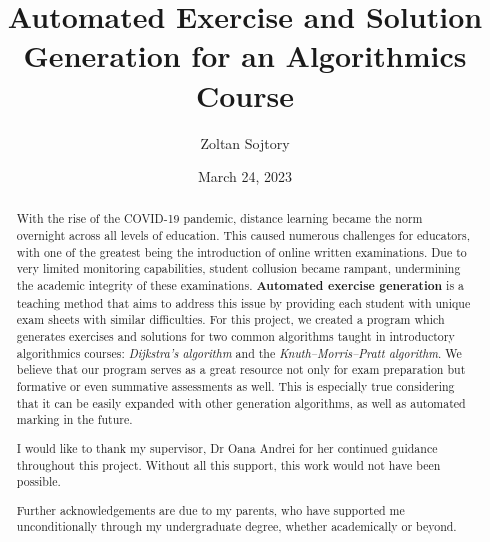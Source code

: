 \documentclass{l4proj}
\begin{document}
\title{Automated Exercise and Solution Generation for an Algorithmics Course}
\author{Zoltan Sojtory}
\date{March 24, 2023}

\maketitle

\begin{abstract}
	With the rise of the COVID-19 pandemic, distance learning became the norm overnight across all levels of education. This caused numerous challenges for educators, with one of the greatest being the introduction of online written examinations. Due to very limited monitoring capabilities, student collusion became rampant, undermining the academic integrity of these examinations. \textbf{Automated exercise generation} is a teaching method that aims to address this issue by providing each student with unique exam sheets with similar difficulties. For this project, we created a program which generates exercises and solutions for two common algorithms taught in introductory algorithmics courses: \textit{Dijkstra's algorithm} and the \textit{Knuth–Morris–Pratt algorithm}. We believe that our program serves as a great resource not only for exam preparation but formative or even summative assessments as well. This is especially true considering that it can be easily expanded with other generation algorithms, as well as automated marking in the future.
\end{abstract}


\renewcommand{\abstractname}{Acknowledgements}
\begin{abstract}
I would like to thank my supervisor, Dr Oana Andrei for her continued guidance throughout this project. Without all this support, this work would not have been possible.

Further acknowledgements are due to my parents, who have supported me unconditionally through my undergraduate degree, whether academically or beyond.
\end{abstract}

%
%
%
\educationalconsent
\end{document}
